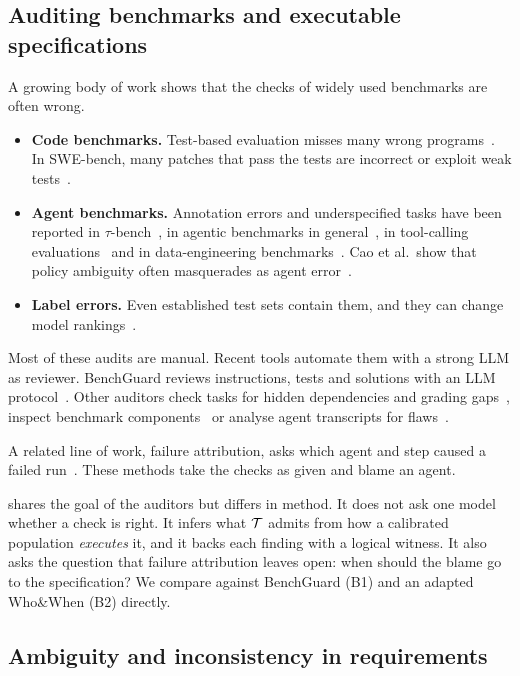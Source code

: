 \subsection{Auditing benchmarks and executable specifications}

A growing body of work shows that the checks of widely used benchmarks are often wrong.
\begin{itemize}[leftmargin=*]
\item \textbf{Code benchmarks.} Test-based evaluation misses many wrong programs~\cite{liu2023your}. In SWE-bench, many patches that pass the tests are incorrect or exploit weak tests~\cite{wang2026solved,yu2025utboost,yu2026swe}.
\item \textbf{Agent benchmarks.} Annotation errors and underspecified tasks have been reported in $\tau$-bench~\cite{cuadron2025saber}, in agentic benchmarks in general~\cite{zhu2025establishing}, in tool-calling evaluations~\cite{bhat2026benchmarking} and in data-engineering benchmarks~\cite{zanoli2026elt}. Cao et al.\ show that policy ambiguity often masquerades as agent error~\cite{cao2026policy}.
\item \textbf{Label errors.} Even established test sets contain them, and they can change model rankings~\cite{northcutt2021pervasive,gema2025done}.
\end{itemize}
Most of these audits are manual. Recent tools automate them with a strong LLM as reviewer. BenchGuard reviews instructions, tests and solutions with an LLM protocol~\cite{tu2026who}. Other auditors check tasks for hidden dependencies and grading gaps~\cite{wang2026automated}, inspect benchmark components~\cite{suh2026agentsuite} or analyse agent transcripts for flaws~\cite{mohl2026automated}.

A related line of work, failure attribution, asks which agent and step caused a failed run~\cite{zhang2025which,cemri2025multi,ge2026spectrum}. These methods take the checks as given and blame an agent.

\specdx shares the goal of the auditors but differs in method. It does not ask one model whether a check is right. It infers what $\mathcal{T}$ admits from how a calibrated population \emph{executes} it, and it backs each finding with a logical witness. It also asks the question that failure attribution leaves open: when should the blame go to the specification? We compare against BenchGuard (B1) and an adapted Who\&When (B2) directly.

\subsection{Ambiguity and inconsistency in requirements}

